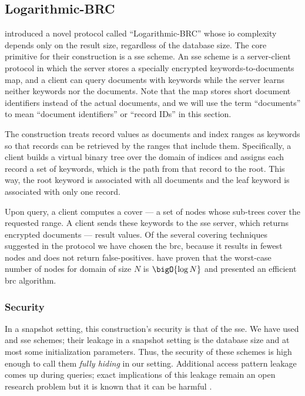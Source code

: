 \subsection{Logarithmic-BRC}

	\textcite{practical-range-search} introduced a novel protocol called ``Logarithmic-BRC'' whose \acrshort{io} complexity depends only on the result size, regardless of the database size.
	The core primitive for their construction is a \acrfull{sse} scheme.
	An \acrshort{sse} scheme is a server-client protocol in which the server stores a specially encrypted keywords-to-documents map, and a client can query documents with keywords while the server
	learns neither keywords nor the documents.
	Note that the map stores short document identifiers instead of the actual documents, and we will use the term ``documents'' to mean ``document identifiers'' or ``record IDs'' in this section.

	The construction treats record values as documents and index ranges as keywords so that records can be retrieved by the ranges that include them.
	Specifically, a client builds a virtual binary tree over the domain of indices and assigns each record a set of keywords, which is the path from that record to the root.
	This way, the root keyword is associated with all documents and the leaf keyword is associated with only one record.

	Upon query, a client computes a cover --- a set of nodes whose sub-trees cover the requested range.
	A client sends these keywords to the \acrshort{sse} server, which returns encrypted documents --- result values.
	Of the several covering techniques suggested in the protocol \cite{practical-range-search} we have chosen the \acrfull{brc}, because it results in fewest nodes and does not return false-positives.
	\textcite{brc} have proven that the worst-case number of nodes for domain of size $N$ is $\bigO{\log N}$ and presented an efficient \acrshort{brc} algorithm.

	\subsubsection{Security}

		In a snapshot setting, this construction's security is that of the \acrshort{sse}.
		We have used \cite{cjjkrs-13} and \cite{cjjjkrs-14} \acrshort{sse} schemes; their leakage in a snapshot setting is the database size and at most some initialization parameters.
		Thus, the security of these schemes is high enough to call them \emph{fully hiding} in our setting.
		Additional access pattern leakage comes up during queries; exact implications of this leakage remain an open research problem but it is known that it can be harmful \cite{generic-attacks-kellaris}.

